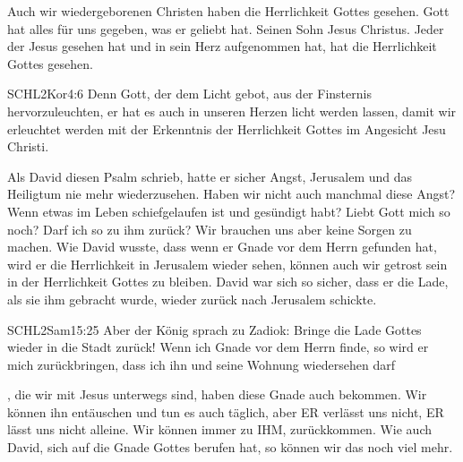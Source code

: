 \documentclass[14pt]{../../inc/mybib}
\begin{document}
    \begin{block}
        Auch wir wiedergeborenen Christen haben die Herrlichkeit Gottes gesehen. Gott hat alles für uns gegeben, was er geliebt hat. Seinen Sohn Jesus Christus. Jeder der Jesus gesehen hat und in sein Herz aufgenommen hat, hat die Herrlichkeit Gottes gesehen.
        \begin{bibelbox}{SCHL}{2Kor}{4:6}
            Denn Gott, der dem Licht gebot, aus der Finsternis hervorzuleuchten, er hat es auch in unseren Herzen licht werden lassen, damit wir erleuchtet werden mit der Erkenntnis der Herrlichkeit Gottes im Angesicht Jesu Christi.
        \end{bibelbox}
    \end{block}

    \begin{block}
        Als David diesen Psalm schrieb, hatte er sicher Angst, Jerusalem und das Heiligtum nie mehr wiederzusehen. Haben wir nicht auch manchmal diese Angst? Wenn etwas im Leben schiefgelaufen ist und gesündigt habt? Liebt Gott mich so noch? Darf ich so zu ihm zurück? Wir brauchen uns aber keine Sorgen zu machen. Wie David wusste, dass wenn er Gnade vor dem Herrn gefunden hat, wird er die Herrlichkeit in Jerusalem wieder sehen, können auch wir getrost sein in der Herrlichkeit Gottes zu bleiben. David war sich so sicher, dass er die Lade, als sie ihm gebracht wurde, wieder zurück nach Jerusalem schickte.
        \begin{bibelbox}{SCHL}{2Sam}{15:25}
            Aber der König sprach zu Zadiok: Bringe die Lade Gottes wieder in die Stadt zurück! Wenn ich Gnade vor dem Herrn finde, so wird er mich zurückbringen, dass ich ihn und seine Wohnung wiedersehen darf
        \end{bibelbox}
        , die wir mit Jesus unterwegs sind, haben diese Gnade auch bekommen. Wir können ihn entäuschen und tun es auch täglich, aber ER verlässt uns nicht, ER lässt uns nicht alleine. Wir können immer zu IHM,  zurückkommen. Wie auch David, sich auf die Gnade Gottes berufen hat, so können wir das noch viel mehr.
    \end{block}
\end{document}
